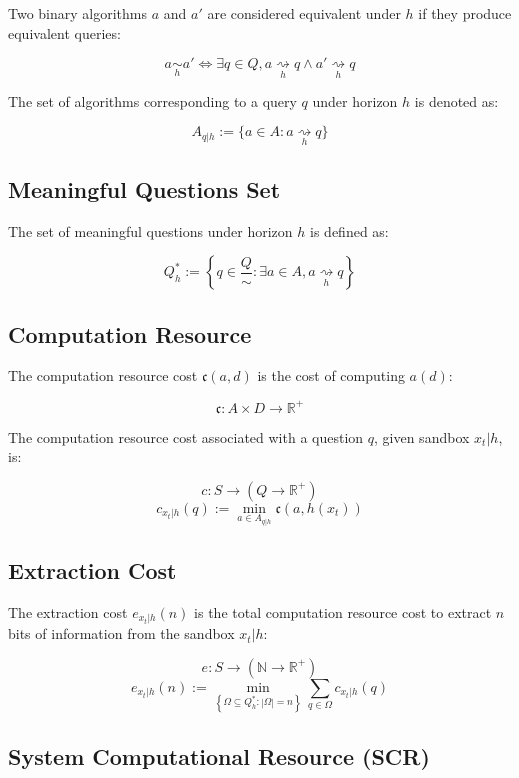 \documentclass[11pt,a4paper]{article}
\theoremstyle{definition}
\theoremstyle{remark}
\numberwithin{equation}{section}
\begin{document}
Two binary algorithms $a$ and $a'$ are considered equivalent under $h$ if they produce equivalent queries:

\[
a \underset{h}{\sim} a' \iff \exists q \in Q , a \underset{h}{\rightsquigarrow}q \wedge a' \underset{h}{\rightsquigarrow}q
\]

The set of algorithms corresponding to a query $q$ under horizon $h$ is denoted as:

\[
A_{q|h} := \{ a \in A : a \underset{h}{\rightsquigarrow} q \}
\]

\subsection{Meaningful Questions Set}

The set of meaningful questions under horizon $h$ is defined as:

\[
Q^*_h := \left\{ q \in \frac{Q}{\sim} : \exists a \in A , a \underset{h}{\rightsquigarrow} q \right\}
\]

\subsection{Computation Resource}

The computation resource cost $\mathfrak{c}(a,d)$ is the cost of computing $a(d)$:

\[
\mathfrak{c} : A \times D \rightarrow \mathbb{R}^+
\]

The computation resource cost associated with a question $q$, given sandbox $x_t|h$, is:

\[
c : S \rightarrow (Q \rightarrow \mathbb{R}^+)
\]
\[
c_{x_t|h}(q) := \min_{a \in A_{q|h}} \mathfrak{c}(a, h(x_t))
\]

\subsection{Extraction Cost}

The extraction cost $e_{x_t|h}(n)$ is the total computation resource cost to extract $n$ bits of information from the sandbox $x_t|h$:

\[
e : S \rightarrow (\mathbb{N} \rightarrow \mathbb{R}^+)
\]
\[
e_{x_t|h}(n) := \min_{\left\{ \Omega \subseteq Q^*_h : |\Omega| = n \right\}} \sum_{q \in \Omega} c_{x_t|h}(q)
\]

\subsection{System Computational Resource (SCR)}
\end{document}
